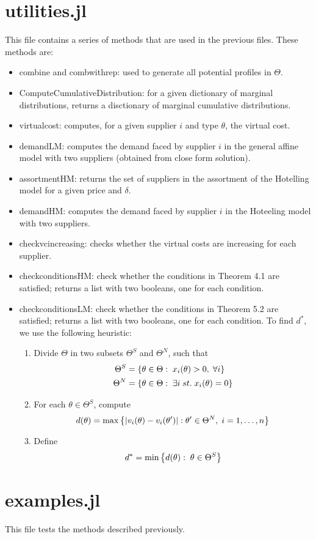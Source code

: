 \documentclass[11pt, oneside]{article}
\begin{document}
\section{utilities.jl}
This file contains a series of methods that are used in the previous files.
These methods are:
\begin{itemize}
    \item combine and combwithrep: used to generate all potential profiles in \(\Theta\).
    \item ComputeCumulativeDistribution: for a given dictionary of marginal
    distributions, returns a disctionary of marginal cumulative distributions.
    \item virtualcost: computes, for a given supplier \(i\) and type \(\theta\), the virtual cost.
    \item demandLM: computes the demand faced by supplier \(i\) in the general
    affine model with two suppliers (obtained from close form solution).
    \item assortmentHM: returns the set of suppliers in the assortment of the
    Hotelling model for a given price and \(\delta\).
    \item demandHM: computes the demand faced by supplier \(i\) in the
    Hoteeling model with two suppliers.
    \item checkvcincreasing: checks whether the virtual costs are increasing
    for each supplier.
    \item checkconditionsHM: check whether the conditions in Theorem 4.1 are
    satisfied; returns a list with two booleans, one for each condition.
    \item checkconditionsLM: check whether the conditions in Theorem 5.2 are
    satisfied; returns a list with two booleans, one for each condition. To
    find \(d^*\), we use the following heuristic:
    \begin{enumerate}
        \item Divide \(\Theta\) in two subsets \(\Theta^S\) and \(\Theta^N\),
        such that
        \[
        \begin{split}
        \Theta^S &= \left\{\theta \in \Theta: \; x_i(\theta) > 0, \; \forall i\right\} \\
        \Theta^N &= \left\{\theta \in \Theta: \; \exists i \; st.\;  x_i(\theta) = 0\right\}
        \end{split}
        \]
        \item For each \(\theta \in \Theta^S\), compute
        \[
        d(\theta) = \max\left\{\left|v_i(\theta)-v_i(\theta')\right|: \theta' \in \Theta^N, \; i=1, \ldots, n\right\}
        \]
        \item Define
        \[
        d^* = \min\left\{d(\theta):\; \theta\in \Theta^S\right\}
        \]
    \end{enumerate}

\end{itemize}


\section{examples.jl}
This file tests the methods described previously.
\end{document}
